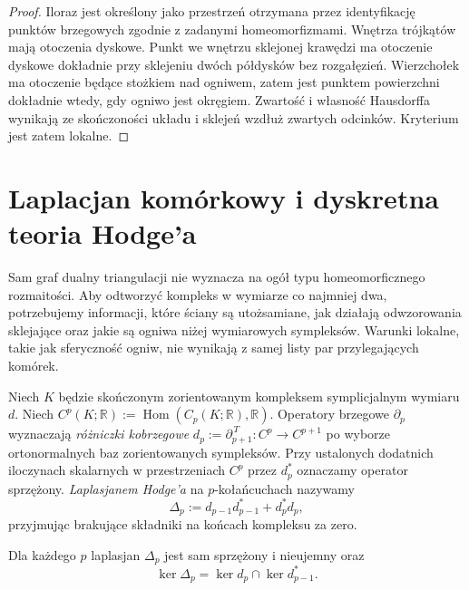 \begin{proof}
Iloraz jest określony jako przestrzeń otrzymana przez
identyfikację punktów brzegowych zgodnie z zadanymi
homeomorfizmami. Wnętrza trójkątów mają otoczenia
dyskowe. Punkt we wnętrzu sklejonej krawędzi ma
otoczenie dyskowe dokładnie przy sklejeniu dwóch
półdysków bez rozgałęzień. Wierzchołek ma otoczenie
będące stożkiem nad ogniwem, zatem jest punktem
powierzchni dokładnie wtedy, gdy ogniwo jest
okręgiem. Zwartość i własność Hausdorffa wynikają
ze skończoności układu i sklejeń wzdłuż zwartych
odcinków. Kryterium jest zatem lokalne.
\end{proof}

\section{Laplacjan komórkowy i dyskretna teoria Hodge'a}
\label{sec:tg-cellular-hodge}

\begin{uwaga}
Sam graf dualny triangulacji nie wyznacza na ogół typu
homeomorficznego rozmaitości. Aby odtworzyć kompleks
w wymiarze co najmniej dwa, potrzebujemy informacji,
które ściany są utożsamiane, jak działają odwzorowania
sklejające oraz jakie są ogniwa niżej wymiarowych sympleksów.
Warunki lokalne, takie jak sferyczność ogniw, nie wynikają
z samej listy par przylegających komórek.
\end{uwaga}

\begin{definicja}
Niech $K$ będzie skończonym zorientowanym
kompleksem symplicjalnym wymiaru $d$. Niech
$C^p(K;\mathbb R):=\operatorname{Hom}(C_p(K;\mathbb R),\mathbb R)$.
Operatory brzegowe $\partial_p$ wyznaczają
\emph{różniczki kobrzegowe}
$d_p:=\partial_{p+1}^{\,T}:C^p\to C^{p+1}$
po wyborze ortonormalnych baz zorientowanych sympleksów.
Przy ustalonych dodatnich iloczynach skalarnych
w przestrzeniach $C^p$ przez $d_p^*$ oznaczamy
operator sprzężony. \emph{Laplasjanem Hodge'a}
na $p$-kołańcuchach nazywamy
\[
\Delta_p:=d_{p-1}d_{p-1}^*+d_p^*d_p,
\]
przyjmując brakujące składniki na końcach
kompleksu za zero.
\end{definicja}

\begin{stwierdzenie}
Dla każdego $p$ laplasjan $\Delta_p$ jest
sam sprzężony i nieujemny oraz
\[
\ker\Delta_p=\ker d_p\cap\ker d_{p-1}^*.
\]
\end{stwierdzenie}

